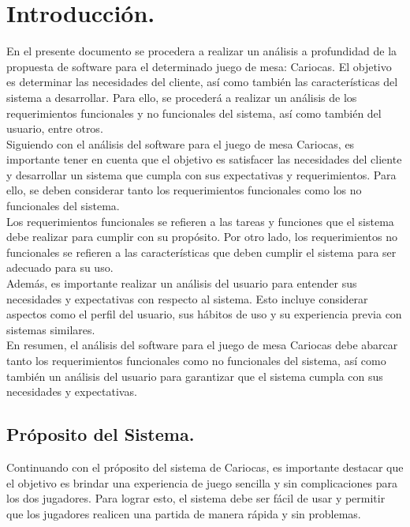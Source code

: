 
\section{Introducción.}\label{cap:intro}

En el presente documento se procedera a realizar un análisis a profundidad de la propuesta de software para 
el determinado juego de mesa: Cariocas. El objetivo es determinar las necesidades del 
cliente, así como también las características del sistema a desarrollar. Para ello, se procederá a realizar 
un análisis de los requerimientos funcionales y no funcionales del sistema, así como también del usuario, entre otros. \\

Siguiendo con el análisis del software para el juego de mesa Cariocas, es importante tener en cuenta que el objetivo es satisfacer las necesidades del cliente y desarrollar un sistema que cumpla con sus expectativas y requerimientos. 
Para ello, se deben considerar tanto los requerimientos funcionales como los no funcionales del sistema.\\

Los requerimientos funcionales se refieren a las tareas y funciones que el sistema debe realizar para cumplir con su propósito. 
Por otro lado, los requerimientos no funcionales se refieren a las características que deben cumplir el sistema para ser adecuado para su uso.\\

Además, es importante realizar un análisis del usuario para entender sus necesidades y expectativas con respecto al sistema. 
Esto incluye considerar aspectos como el perfil del usuario, sus hábitos de uso y su experiencia previa con sistemas similares.\\

En resumen, el análisis del software para el juego de mesa Cariocas debe abarcar tanto los requerimientos funcionales como no funcionales del sistema, así como también un análisis del usuario para garantizar que el sistema cumpla con sus necesidades y expectativas.


\subsection{Próposito del Sistema.}\label{cap:proposito}
Continuando con el próposito del sistema de Cariocas, es importante destacar que el objetivo es 
brindar una experiencia de juego sencilla y sin complicaciones para los dos jugadores. Para lograr esto, 
el sistema debe ser fácil de usar y permitir que los jugadores realicen una partida de manera rápida y sin problemas.\\

